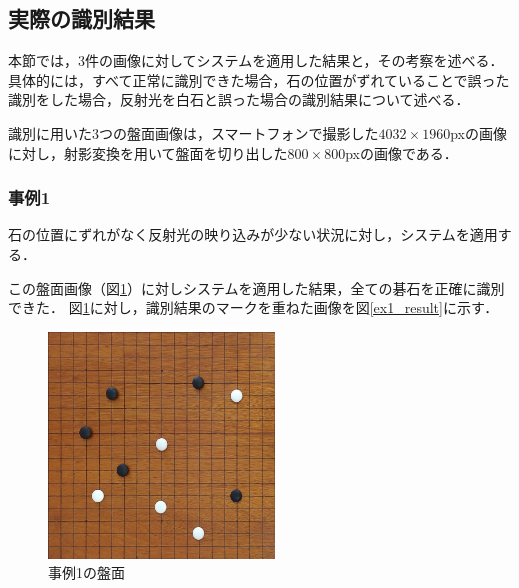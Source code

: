 \documentclass[openright]{nitocs}
\numberwithin{equation}{section}
\begin{document}
        \subsection{実際の識別結果} %
        \label{identify_result}
            本節では，3件の画像に対してシステムを適用した結果と，その考察を述べる．
            具体的には，すべて正常に識別できた場合，石の位置がずれていることで誤った識別をした場合，反射光を白石と誤った場合の識別結果について述べる．

            識別に用いた3つの盤面画像は，スマートフォンで撮影した$4032\times1960$pxの画像に対し，射影変換を用いて盤面を切り出した$800\times800$pxの画像である．

            \subsubsection{事例1}
                石の位置にずれがなく反射光の映り込みが少ない状況に対し，システムを適用する．

                この盤面画像（図\ref{ex1}）に対しシステムを適用した結果，全ての碁石を正確に識別できた．
                図\ref{ex1}に対し，識別結果のマークを重ねた画像を図\ref{ex1_result}に示す．
                \begin{figure}[tb] %
                    \begin{center}
                    \includegraphics[clip,width=60mm]{DSC_0041/boardImg.jpg} 
                    \caption{事例1の盤面}
                    \label{ex1}
                    \end{center}
                \end{figure}
\end{document}
